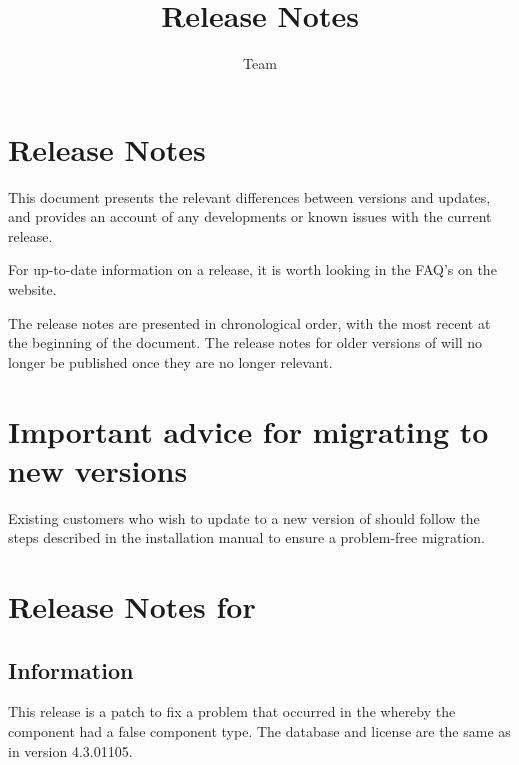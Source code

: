 \documentclass[en,a4paper,twoside,manual,guidancer]{bxreport}
\begin{document}
\title{\jb{} Release Notes}
\author*{\jb{} Team}{}
\maketitle

\setcounter{secnumdepth}{0}

\clearpage
\section{\jb{}Release Notes}
This document presents the relevant differences between versions and updates, and provides an account of any developments or known issues with the current release. 

For up-to-date information on a release, it is worth looking in the FAQ's on the \jb{} website. 

The release notes are presented in chronological order, with the most recent at the beginning of the document. The release notes for older versions of \jb{}  will no longer be published once they are no longer relevant. 

\section{Important advice for migrating to new \jb{} versions}
Existing customers who wish to update to a new version of \jb{} should follow the steps described in the installation manual to ensure a problem-free migration.


\makeatletter
\section{Release Notes for \jb{} \@bxversion}
\makeatother
\subsection{Information}
This release is a patch to fix a problem that occurred in the  whereby the  component had a false component type. The database and license are the same as in version 4.3.01105. 
\end{document}
